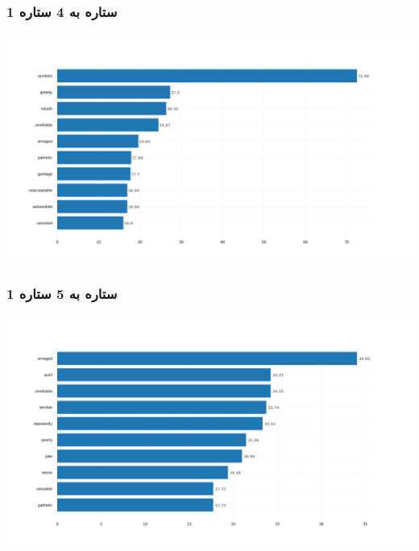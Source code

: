 \subsubsection{\Large 1 ستاره به 4 ستاره}
            { \selectfont \setLR
            \begin{center}
            \includegraphics[scale=0.4]{Images/rel_norm_freq_1_4.png}
            \end{center}
            \begin{adjustbox}{width=\textwidth}
            \end{adjustbox}
            }
\subsubsection{\Large 1 ستاره به 5 ستاره}
            { \selectfont \setLR
            \begin{center}
            \includegraphics[scale=0.4]{Images/rel_norm_freq_1_5.png}
            \end{center}
            \begin{adjustbox}{width=\textwidth}
            \end{adjustbox}
            }
